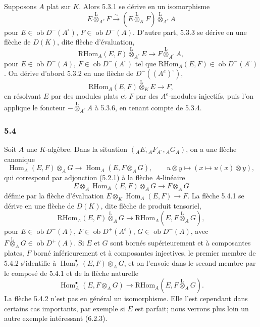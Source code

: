 \documentclass[11pt]{article}
\DeclareMathOperator{\Hom}{Hom}
\newcommand{\ob}{\operatorname{ob}}
\providecommand{\RHom}{\mathrm{RHom}}
\providecommand{\lten}{\overset{\mathrm L}{\otimes}}
\providecommand{\RHom}{\mathrm{RHom}}
\providecommand{\Hom}{\operatorname{Hom}}
\providecommand{\ob}{\operatorname{ob}}
\providecommand{\lten}{\overset{\mathrm L}{\otimes}}
\providecommand{\RHom}{\mathrm R\mathcal{H}om}
\providecommand{\lten}{\overset{\mathrm L}{\otimes}}
\providecommand{\lten}{\overset{\mathrm L}{\otimes}}
\providecommand{\lten}{\overset{\mathrm L}{\otimes}}
\providecommand{\lten}{\overset{\mathrm L}{\otimes}}
\providecommand{\RHom}{\mathrm{RHom}}
\providecommand{\Hom}{\operatorname{Hom}}
\providecommand{\lten}{\overset{\mathrm L}{\otimes}}
\begin{document}
Supposons $A$ plat sur $K$. Alors 5.3.1 se dérive en un isomorphisme
\begin{equation}\tag{5.3.4}
E\lten_{A^e}F\xrightarrow{\sim}(E\lten_KF)\lten_{A^e}A
\end{equation}
pour $E\in\ob D^-(A^\circ)$, $F\in\ob D^-(A)$. D'autre part, 5.3.3 se dérive en une flèche de $D(K)$, dite flèche d'évaluation,
\begin{equation}\tag{5.3.5}
\RHom_A(E,F)\lten_{A^e}E\longrightarrow F\lten_{A^e}A,
\end{equation}
pour $E\in\ob D^-(A)$, $F\in\ob D^-(A^\circ)$ tel que $\RHom_A(E,F)\in\ob D^-(A^\circ)$. On dérive d'abord 5.3.2 en une flèche de $D^-((A^e)^\circ)$,
\begin{equation}\tag{5.3.6}
\RHom_A(E,F)\lten_KE\longrightarrow F,
\end{equation}
en résolvant $E$ par des modules plats et $F$ par des $A^e$-modules injectifs, puis l'on applique le foncteur $-\lten_{A^e}A$ à 5.3.6, en tenant compte de 5.3.4.

\subsubsection*{5.4}

Soit $A$ une $K$-algèbre. Dans la situation $({}_AE,{}_AF_{A^\circ},{}_AG_A)$, on a une flèche canonique
\begin{equation}\tag{5.4.1}
\Hom_A(E,F)\otimes_AG\longrightarrow\Hom_A(E,F\otimes_AG),
\qquad u\otimes y\longmapsto(x\longmapsto u(x)\otimes y),
\end{equation}
qui correspond par adjonction (5.2.1) à la flèche $A$-linéaire
\[
E\otimes_A\Hom_A(E,F)\otimes_AG\longrightarrow F\otimes_AG
\]
définie par la flèche d'évaluation $E\otimes_K\Hom_A(E,F)\to F$. La flèche 5.4.1 se dérive en une flèche de $D(K)$, dite flèche de produit tensoriel,
\begin{equation}\tag{5.4.2}
\RHom_A(E,F)\lten_AG\longrightarrow\RHom_A(E,F\lten_AG),
\end{equation}
pour $E\in\ob D^-(A)$, $F\in\ob D^+(A^e)$, $G\in\ob D^-(A)$, avec $F\lten_AG\in\ob D^+(A)$. Si $E$ et $G$ sont bornés supérieurement et à composantes plates, $F$ borné inférieurement et à composantes injectives, le premier membre de 5.4.2 s'identifie à $\Hom_A^\bullet(E,F)\otimes_AG$, et on l'envoie dans le second membre par le composé de 5.4.1 et de la flèche naturelle
\[
\Hom_A^\bullet(E,F\otimes_AG)\longrightarrow \RHom_A(E,F\lten_AG).
\]
La flèche 5.4.2 n'est pas en général un isomorphisme. Elle l'est cependant dans certains cas importants, par exemple si $E$ est parfait; nous verrons plus loin un autre exemple intéressant (6.2.3).
\end{document}
